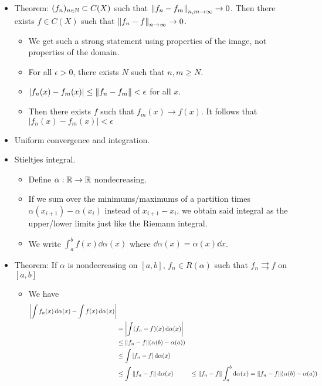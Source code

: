 \documentclass[../../notes.tex]{subfiles}
\begin{document}
\begin{itemize}
\begin{itemize}
    \end{itemize}
    \item Theorem: $(f_n)_{n\in\mathbb{N}}\subset C(X)$ such that $\norm{f_n-f_m}_{n,m\to\infty}\to 0$. Then there exists $f\in C(X)$ such that $\norm{f_n-f}_{n\to\infty}\to 0$.
    \begin{itemize}
        \item We get such a strong statement using properties of the image, not properties of the domain.
        \item For all $\epsilon>0$, there exists $N$ such that $n,m\geq N$.
        \item $|f_n(x)-f_m(x)|\leq\norm{f_n-f_m}<\epsilon$ for all $x$.
        \item Then there exists $f$ such that $f_m(x)\to f(x)$. It follows that $|f_n(x)-f_m(x)|<\epsilon$
    \end{itemize}
    \item Uniform convergence and integration.
    \item Stieltjes integral.
    \begin{itemize}
        \item Define $\alpha:\mathbb{R}\to\mathbb{R}$ nondecreasing.
        \item If we sum over the minimums/maximums of a partition times $\alpha(x_{i+1})-\alpha(x_i)$ instead of $x_{i+1}-x_i$, we obtain said integral as the upper/lower limits just like the Riemann integral.
        \item We write $\int_a^bf(x)\dd{\alpha(x)}$ where $\dd{\alpha(x)}=\alpha(x)\dd{x}$.
    \end{itemize}
    \item Theorem: If $\alpha$ is nondecreasing on $[a,b]$, $f_n\in R(\alpha)$ such that $f_n\rightrightarrows f$ on $[a,b]$
    \begin{itemize}
        \item We have
        \begin{align*}
            \left| \int f_n(x)\dd{\alpha(x)}-\int f(x)\dd{\alpha(x)} \right|\\
            &= \left| \int (f_n-f)(x)\dd{\alpha(x)}\right|\\
            &\leq \norm{f_n-f}(\alpha(b)-\alpha(a))\\
            &\leq \int|f_n-f|\dd{\alpha(x)}\\
            &\leq \int\norm{f_n-f}\dd{\alpha(x)}
            &\leq \norm{f_n-f}\int_a^b\dd{\alpha(x)}
            &= \norm{f_n-f}(\alpha(b)-\alpha(a))
        \end{align*}
    \end{itemize}
\end{itemize}
\end{document}
